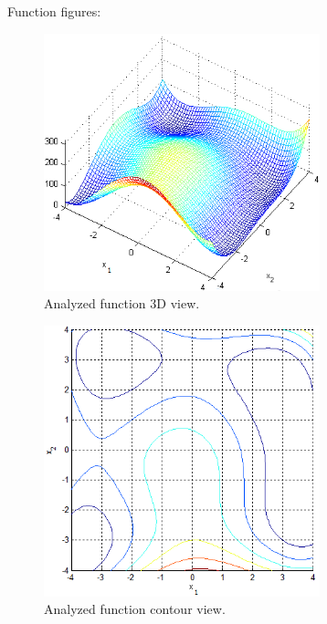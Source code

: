 \documentclass[12pt]{article}
\begin{document}
Function figures:
\begin{figure}[H]
	\begin{center}
		\includegraphics[width=8cm]{himm.png}
		\caption{Analyzed function 3D view.}
	\end{center}
\end{figure}
\begin{figure}[H]
	\begin{center}
		\includegraphics[width=8cm]{himm_count.png}
		\caption{Analyzed function contour view.}
	\end{center}
\end{figure}
\end{document}
